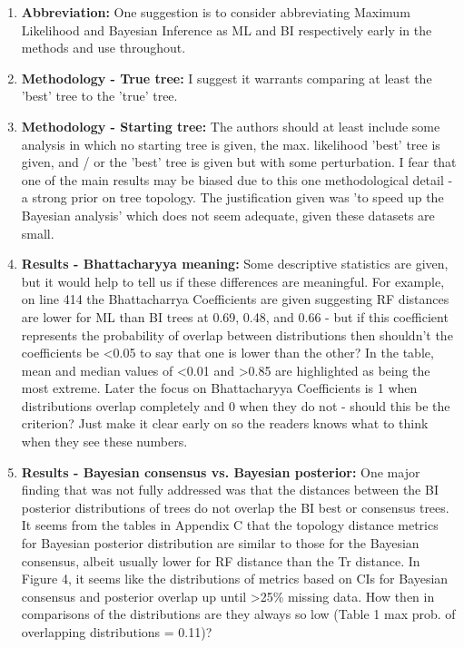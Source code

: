 \documentclass[12pt,letterpaper]{article}
\begin{document}
\begin{enumerate}
\item{\textbf{Abbreviation:}} One suggestion is to consider abbreviating Maximum Likelihood and Bayesian Inference as ML and BI respectively early in the methods and use throughout.

\item{\textbf{Methodology - True tree:}} I suggest it warrants comparing at least the 'best' tree to the 'true' tree.

\item{\textbf{Methodology - Starting tree:}} The authors should at least include some analysis in which no starting tree is given, the max. likelihood 'best' tree is given, and / or the 'best' tree is given but with some perturbation.
I fear that one of the main results may be biased due to this one methodological detail - a strong prior on tree topology.
The justification given was 'to speed up the Bayesian analysis' which does not seem adequate, given these datasets are small.

\item{\textbf{Results - Bhattacharyya meaning:}} Some descriptive statistics are given, but it would help to tell us if these differences are meaningful.
For example, on line 414 the Bhattacharrya Coefficients are given suggesting RF distances are lower for ML than BI trees at 0.69, 0.48, and 0.66 - but if this coefficient represents the probability of overlap between distributions then shouldn't the coefficients be <0.05 to say that one is lower than the other?
In the table, mean and median values of <0.01 and >0.85 are highlighted as being the most extreme.
Later the focus on Bhattacharyya Coefficients is 1 when distributions overlap completely and 0 when they do not - should this be the criterion?
Just make it clear early on so the readers knows what to think when they see these numbers. 

\item{\textbf{Results - Bayesian consensus vs. Bayesian posterior:}} One major finding that was not fully addressed was that the distances between the BI posterior distributions of trees do not overlap the BI best or consensus trees.
It seems from the tables in Appendix C that the topology distance metrics for Bayesian posterior distribution are similar to those for the Bayesian consensus, albeit usually lower for RF distance than the Tr distance.
In Figure 4, it seems like the distributions of metrics based on CIs for Bayesian consensus and posterior overlap up until >25\% missing data.
How then in comparisons of the distributions are they always so low (Table 1 max prob. of overlapping distributions = 0.11)?


\end{enumerate}
\end{document}
